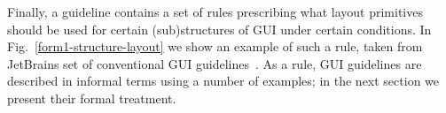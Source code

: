 Finally, a guideline contains a set of rules prescribing what layout primitives should be used for
certain (sub)structures of GUI under certain conditions. In Fig.~\ref{form1-structure-layout}
we show an example of such a rule, taken from JetBrains set of conventional GUI guidelines~\cite{JBG}.
As a rule, GUI guidelines are described in informal terms using a number of examples; in the next section
we present their formal treatment.

